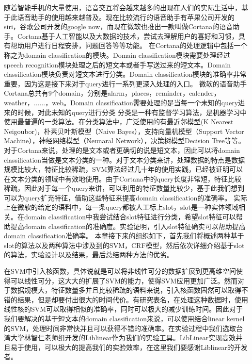\documentclass[master]{njuthesis}
\begin{document}
    随着智能手机的大量使用，语音交互将会越来越多的出现在人们的实际生活中，基于此语音助手的使用越来越普及。现在比较流行的语音助手有苹果公司开发的siri，谷歌公司开发的google now，而现在微软也推出一款叫做Cortana的语音助手。Cortana基于人工智能以及大数据的技术，尝试去理解用户的喜好和习惯，具有帮助用户进行日程安排，问题回答等等功能。
    在Cortana的处理逻辑中包括一个称之为domain classification的模块。Domain classification模块需要处理经过speech recognition模块处理之后的短文本或者手写送过来的短文本。Domain classification模块负责对短文本进行分类。Domain classification模块的准确率非常重要，因为这是接下来对于query进行一系列更深入处理的入口。
    微软的语音助手Cortana总共有9个domain，分别是alarm，places，reminder，calender，weather，......，web。Domain classification需要处理的是当每一个未知的query进来的时候，对此未知的query进行分类
    分类是一种有监督学习算法，是机器学习中使用最普遍的一类算法。在分类算法中，广泛使用的有最近邻模型(K Nearest Neigoubor)，朴素贝叶斯模型（Naive Bayes），支持向量机模型（Support Vector Machine），神经网络模型（Neunaral Network），决策树模型Decision Tree等等。对于Cortana来说，处理的是文本或者更确切的说是短文本，因此可以将domain classification当做是文本分类的一种。对于文本分类来讲，处理数据的特点是数据规模比较大，特征比较稀疏，SVM算法经过几十年的使用实践，已经被证明可以在文本分类的领域中有效地使用。由于Cortana中的query长度非常短，特征比较稀疏，因此对于每一个query来讲，可以利用的特征数量比较少，基于此我们想到可以为query扩充特征，借助这些特征来提高domain classification的准确率。
    实际上在微软的给定的语料中，每一条query都被人工标上slot，slot是一种实体领域相关。在domain classification中我尝试结合slot特征进行分类，希望slot特征可以帮助提高domain classification的准确度。实验证明，引入slot特征确实可以帮助提高domain classification准确率。
    本章接下来的组织如下，首先我们将概述两种基于slot的算法以及两种算法中涉及到的SVM，CRF模型，然后依次详细介绍基于slot的算法，实验设计以及结果，最后总结两种方法的优劣。

    在SVM中引入核函数，具体说就是可以将非线性可分的数据扩展到更高维空间使得可以线性可分，这大大的扩展了SVM的能力，使得SVM应用更加广泛。然而对于数据规模大，特征数量多并且比较稀疏的语料来说，引入核函数固然可以取得不错的结果，但是却要付出很大的时间代价。有研究表名，在处理这种数据时，使用线性核的SVM可以取得相似的准确率，同时可以极大的减少训练时间。因此对于我们要解决的基于短文本的domain classification来说，可以使用结合linear kernel的SVM，处理时间非常快并且可以获得不错的准确率。在实验过程中我们选取台湾大学林智仁老师组开发的Liblinear作为我们的实验工具。LibLinear实现高效并且易于使用，可以极大的提高我们的实验效率，在这里我们要感谢Liblinear的开发者。
    
\end{document}
